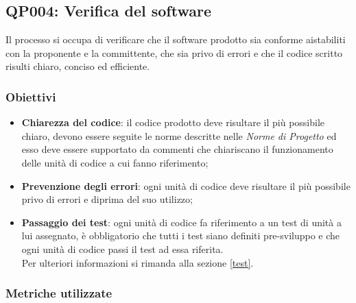 \subsection{QP004: Verifica del software}
Il processo si occupa di verificare che il software prodotto sia conforme aistabiliti con la proponente e la committente, che sia privo di errori e che il codice scritto risulti chiaro, conciso ed efficiente.
\subsubsection{Obiettivi}
\begin{itemize}
	\item \textbf{Chiarezza del codice}: il codice prodotto deve risultare il più possibile chiaro, devono essere seguite le norme descritte nelle \textit{Norme di Progetto} ed esso deve essere supportato da commenti che chiariscano il funzionamento delle unità di codice a cui fanno riferimento;
	\item \textbf{Prevenzione degli errori}: ogni unità di codice deve risultare il più possibile privo di errori e diprima del suo utilizzo;
	\item \textbf{Passaggio dei test}: ogni unità di codice fa riferimento a un test di unità a lui assegnato, è obbligatorio che tutti i test siano definiti pre-sviluppo e che ogni unità di codice passi il test ad essa riferita.\\
	Per ulteriori informazioni si rimanda alla sezione \ref{test}.
\end{itemize}
\subsubsection{Metriche utilizzate}

